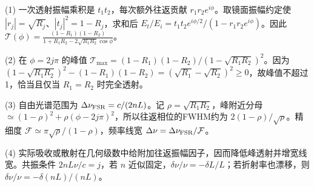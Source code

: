 (1) 一次透射振幅乘积是 \(t_1t_2\)，每次额外往返贡献 \(r_1r_2e^{i\phi}\)。取镜面振幅约定使 \(|r_j|=\sqrt{R_j}\)、\(|t_j|^2=1-R_j\)，求和后 \(E_t/E_i=t_1t_2e^{i\phi/2}/(1-r_1r_2e^{i\phi})\)。因此 \(\boxed{\mathcal T(\phi)=\frac{(1-R_1)(1-R_2)}{1+R_1R_2-2\sqrt{R_1R_2}\cos\phi}}\)。

(2) 在 \(\phi=2j\pi\) 的峰值 \(\mathcal T_{\max}=(1-R_1)(1-R_2)/(1-\sqrt{R_1R_2})^2\)。因为 \((1-\sqrt{R_1R_2})^2-(1-R_1)(1-R_2)=(\sqrt{R_1}-\sqrt{R_2})^2\ge0\)，故峰值不超过1，恰当且仅当 \(R_1=R_2\) 时完全透射。

(3) 自由光谱范围为 \(\Delta\nu_{\rm FSR}=c/(2nL)\)。记 \(\rho=\sqrt{R_1R_2}\)，峰附近分母 \(\simeq(1-\rho)^2+\rho(\phi-2j\pi)^2\)，所以往返相位的FWHM约为 \(2(1-\rho)/\sqrt\rho\)。精细度 \(\boxed{\mathcal F\simeq\pi\sqrt\rho/(1-\rho)}\)，频率线宽 \(\Delta\nu=\Delta\nu_{\rm FSR}/\mathcal F\)。

(4) 实际吸收或散射在几何级数中给附加往返振幅因子，因而降低峰透射并增宽线宽。共振条件 \(2nL\nu/c=j\)，若 \(n\) 近似固定，\(\delta\nu/\nu=-\delta L/L\)；若折射率也漂移，则 \(\delta\nu/\nu=-\delta(nL)/(nL)\)。
